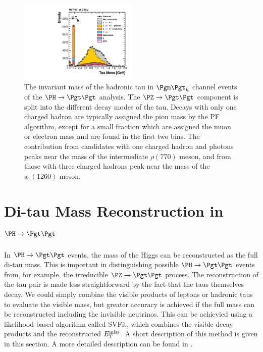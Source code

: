 \begin{figure}[htb]
\begin{center}
    \includegraphics[width=0.5\textwidth]
      {plots/reco/m_2_tau_modes_mt_2012.pdf}
\end{center}
\caption[The invariant mass of the hadronic tau in $\mutau$ channel events of
the $\PH\to\Pgt\Pgt$ analysis.]{The invariant mass of the hadronic tau in $\mutau$ channel events of
the $\PH\to\Pgt\Pgt$ analysis. The $\PZ\to\Pgt\Pgt$ component is split into the
different decay modes of the tau. Decays with only one charged hadron are
typically assigned the pion mass by the \ac{PF} algorithm, except for a small
fraction which are assigned the muon or electron mass and are found in the first
two bins. The contribution from candidates with one charged hadron and photons
peaks near the mass of the intermediate $\rho(770)$ meson, and from those with
three charged hadrons peak near the mass of the $\text{a}_{1}(1260)$ meson.}
\label{fig:taumass}
\end{figure}

\section{Di-tau Mass Reconstruction in $\PH \to \Pgt\Pgt$}
\label{sec:svfit}

In $\PH \to \Pgt\Pgt$ events, the mass of the Higgs can be reconstructed as the full 
di-tau mass. This is important in distinguishing possible $\PH\to\Pgt\Pgt$
events from, for example, the irreducible $\PZ \to \Pgt\Pgt$ process. 
The reconstruction of the tau pair is made less straightforward
by the fact that the taus themselves decay. We could simply combine the visible
products of leptons or hadronic taus to evaluate the visible mass,
but greater accuracy is achieved if the full mass can be reconstructed including the
invisible neutrinos. This can be achievied using a likelihood based algorithm called
SVFit, which combines the visible decay products and the reconstructed $E_{\mathrm{T}}^{\text{miss}}$. A
short description of this method is given in this section. A more detailed
description can be found in \cite{HIG-13-004}.

